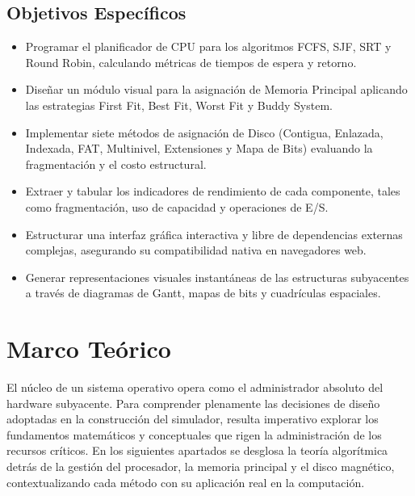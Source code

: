 \documentclass[12pt,a4paper]{article}
\begin{document}
\subsection{Objetivos Específicos}
\begin{itemize}
    \item Programar el planificador de CPU para los algoritmos FCFS, SJF, SRT y Round Robin, calculando métricas de tiempos de espera y retorno.
    \item Diseñar un módulo visual para la asignación de Memoria Principal aplicando las estrategias First Fit, Best Fit, Worst Fit y Buddy System.
    \item Implementar siete métodos de asignación de Disco (Contigua, Enlazada, Indexada, FAT, Multinivel, Extensiones y Mapa de Bits) evaluando la fragmentación y el costo estructural.
    \item Extraer y tabular los indicadores de rendimiento de cada componente, tales como fragmentación, uso de capacidad y operaciones de E/S.
    \item Estructurar una interfaz gráfica interactiva y libre de dependencias externas complejas, asegurando su compatibilidad nativa en navegadores web.
    \item Generar representaciones visuales instantáneas de las estructuras subyacentes a través de diagramas de Gantt, mapas de bits y cuadrículas espaciales.
\end{itemize}

\section{Marco Teórico}

El núcleo de un sistema operativo opera como el administrador absoluto del hardware subyacente. Para comprender plenamente las decisiones de diseño adoptadas en la construcción del simulador, resulta imperativo explorar los fundamentos matemáticos y conceptuales que rigen la administración de los recursos críticos. En los siguientes apartados se desglosa la teoría algorítmica detrás de la gestión del procesador, la memoria principal y el disco magnético, contextualizando cada método con su aplicación real en la computación.
\end{document}
